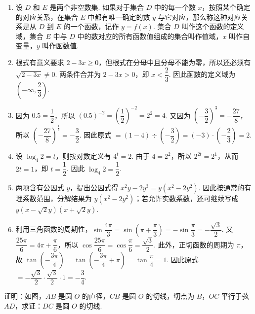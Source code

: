 \begin{solution}
\begin{enumerate}
    \item 设 \(D\) 和 \(E\) 是两个非空数集. 如果对于集合 \(D\) 中的每一个数 \(x\)，按照某个确定的对应关系，在集合 \(E\) 中都有唯一确定的数 \(y\) 与它对应，那么称这种对应关系是从 \(D\) 到 \(E\) 的一个函数，记作 \(y=f(x)\). 集合 \(D\) 叫作这个函数的定义域，集合 \(E\) 中与 \(D\) 中的数对应的所有函数值组成的集合叫作值域，\(x\) 叫作自变量，\(y\) 叫作函数值.
    \item 根式有意义要求 \(2-3x\geqslant0\)，但根式在分母中且分母不能为零，所以还必须有 \(\sqrt{2-3x}\ne0\). 两条件合并为 \(2-3x>0\)，即 \(x<\dfrac{2}{3}\). 因此函数的定义域为 \(\left(-\infty,\dfrac{2}{3}\right)\).
    \item 因为 \(0.5=\dfrac{1}{2}\)，所以 \(\left(0.5\right)^{-2}=\left(\dfrac{1}{2}\right)^{-2}=2^2=4\). 又因为 \(\left(-\dfrac{3}{2}\right)^3=-\dfrac{27}{8}\)，所以 \(\left(-\dfrac{27}{8}\right)^{\frac{1}{3}}=-\dfrac{3}{2}\). 因此原式 \(=(1-4)\div\left(-\dfrac{3}{2}\right)=(-3)\cdot\left(-\dfrac{2}{3}\right)=2\).
    \item 设 \(\log_{4}2=t\)，则按对数定义有 \(4^t=2\). 由于 \(4=2^2\)，所以 \(2^{2t}=2^1\)，从而 \(2t=1\)，即 \(t=\dfrac{1}{2}\). 因此 \(\log_{4}2=\dfrac{1}{2}\).
    \item 两项含有公因式 \(y\)，提出公因式得 \(x^2y-2y^3=y\left(x^2-2y^2\right)\). 因此按通常的有理系数范围，分解结果为 \(y\left(x^2-2y^2\right)\)；若允许实数系数，还可继续写成 \(y\left(x-\sqrt{2}y\right)\left(x+\sqrt{2}y\right)\).
    \item 利用三角函数的周期性，\(\sin\dfrac{4\pi}{3}=\sin\left(\pi+\dfrac{\pi}{3}\right)=-\sin\dfrac{\pi}{3}=-\dfrac{\sqrt{3}}{2}\). 又 \(\dfrac{25\pi}{6}=4\pi+\dfrac{\pi}{6}\)，所以 \(\cos\dfrac{25\pi}{6}=\cos\dfrac{\pi}{6}=\dfrac{\sqrt{3}}{2}\). 此外，正切函数的周期为 \(\pi\)，故 \(\tan\left(-\dfrac{3\pi}{4}\right)=\tan\left(-\dfrac{3\pi}{4}+\pi\right)=\tan\dfrac{\pi}{4}=1\). 因此原式 \(=-\dfrac{\sqrt{3}}{2}\cdot\dfrac{\sqrt{3}}{2}\cdot1=-\dfrac{3}{4}\).
\end{enumerate}
\end{solution}

\begin{problem}
证明：如图，\(AB\) 是圆 \(O\) 的直径，\(CB\) 是圆 \(O\) 的切线，切点为 \(B\)，\(OC\) 平行于弦 \(AD\)，求证：\(DC\) 是圆 \(O\) 的切线.

\end{problem}

